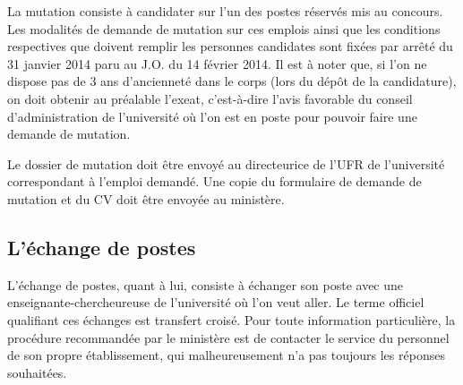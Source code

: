 
La mutation consiste \`a candidater sur l'un des postes r\'eserv\'es mis au
concours. %
Les modalit\'es de demande de mutation sur ces emplois ainsi que les conditions respectives 
que doivent remplir les personnes candidates sont fix\'ees par  arr\^et\'e du 31 janvier 2014 
paru au J.O. du 14 f\'evrier 2014. Il est \`a noter que, si l'on ne dispose pas de 3 ans
d'anciennet\'e dans le corps (lors du d\'ep\^ot de la candidature),
on doit obtenir au pr\'ealable l'exeat, c'est-\`a-dire l'avis
favorable du conseil d'administration de l'universit\'e o\`u l'on
est en poste pour pouvoir faire une demande de mutation.

Le dossier de mutation doit \^etre envoy\'e au directeur\mp ice de l'UFR de l'universit\'e correspondant \`a l'emploi demand\'e. Une copie du formulaire de demande de mutation et du CV doit \^etre envoy\'ee au minist\`ere.

\subsection*{L'\'echange de postes}

L'\'echange de postes, quant \`a lui, consiste \`a \'echanger son
poste avec un\mp e enseignant\mp e-chercheur\mp euse de l'universit\'e o\`u l'on veut
aller. Le terme officiel qualifiant ces \'echanges est
\og transfert crois\'e\fg{}. Pour toute information particuli\`ere, la proc\'edure recommand\'ee
par le minist\`ere est de contacter le service du personnel de son
propre \'etablissement, qui malheureusement n'a pas toujours les r\'eponses
souhait\'ees.

